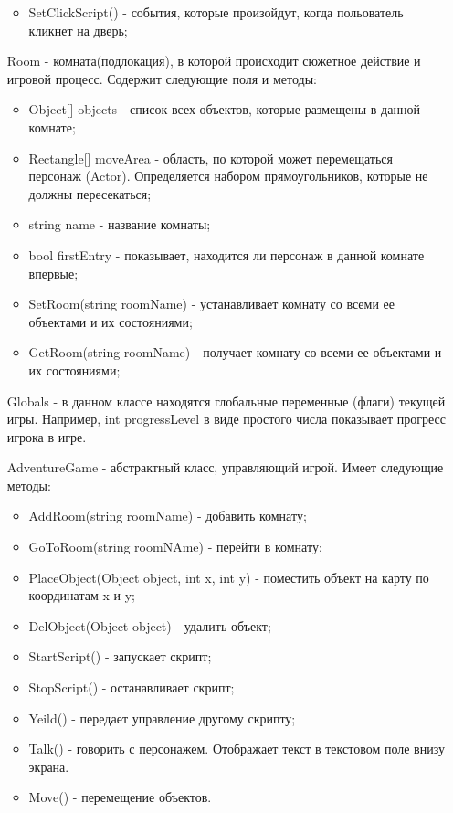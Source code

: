 \begin{enumerate}
\begin{itemize}
		\item SetClickScript() - события, которые произойдут, когда польователь кликнет на дверь;
	\end{itemize}
	\item[Room] - комната(подлокация), в которой происходит сюжетное действие и игровой процесс. Содержит следующие поля и методы:
	\begin{itemize}
		\item Object[] objects - список всех объектов, которые размещены в данной комнате;
		\item Rectangle[] moveArea - область, по которой может перемещаться персонаж (Actor). Определяется набором прямоугольников, которые не должны пересекаться;
		\item string name - название комнаты;
		\item bool firstEntry - показывает, находится ли персонаж в данной комнате впервые;
		\item SetRoom(string roomName) - устанавливает комнату со всеми ее объектами и их состояниями;
		\item GetRoom(string roomName) - получает комнату со всеми ее объектами и их состояниями;
	\end{itemize}
	\item[Globals] - в данном классе находятся глобальные переменные (флаги) текущей игры. Например, int progressLevel в виде простого числа показывает прогресс игрока в игре.
	\item[AdventureGame] - абстрактный класс, управляющий игрой. Имеет следующие методы:
	\begin{itemize}
		\item AddRoom(string roomName) - добавить комнату;
		\item GoToRoom(string roomNAme) - перейти в комнату;
		\item PlaceObject(Object object, int x, int y) - поместить объект на карту по координатам x и y;
		\item DelObject(Object object) - удалить объект;
		\item StartScript() - запускает скрипт;
		\item StopScript() - останавливает скрипт;
		\item Yeild() - передает управление другому скрипту;
		\item Talk() - говорить с персонажем. Отображает текст в текстовом поле внизу экрана. 
		\item Move() - перемещение объектов.
	\end{itemize}
\end{enumerate}



